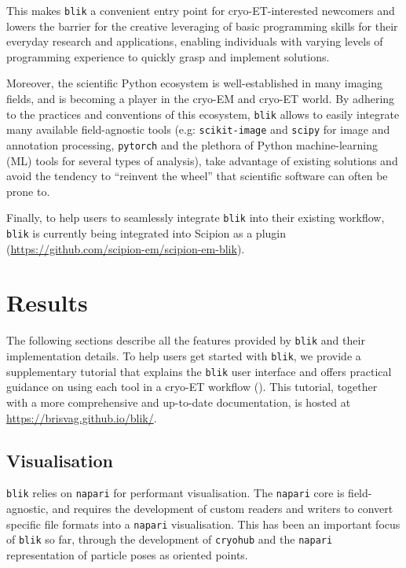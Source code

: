 This makes \texttt{blik} a convenient entry point for cryo-ET-interested newcomers and lowers the barrier for the creative leveraging of basic programming skills for their everyday research and applications, enabling individuals with varying levels of programming experience to quickly grasp and implement solutions.

Moreover, the scientific Python ecosystem is well-established in many imaging fields, and is becoming a player in the cryo-EM and cryo-ET world. By adhering to the practices and conventions of this ecosystem, \texttt{blik} allows to easily integrate many available field-agnostic tools (e.g: \texttt{scikit-image} and \texttt{scipy} for image and annotation processing, \texttt{pytorch} and the plethora of Python machine-learning (ML) tools for several types of analysis), take advantage of existing solutions and avoid the tendency to ``reinvent the wheel'' that scientific software can often be prone to.

\vspace{\baselineskip}

Finally, to help users to seamlessly integrate \texttt{blik} into their existing workflow, \texttt{blik} is currently being integrated into Scipion as a plugin (\url{https://github.com/scipion-em/scipion-em-blik}).

\section{Results}

The following sections describe all the features provided by \texttt{blik} and their implementation details. To help users get started with \texttt{blik}, we provide a supplementary tutorial that explains the \texttt{blik} user interface and offers practical guidance on using each tool in a cryo-ET workflow (). This tutorial, together with a more comprehensive and up-to-date documentation, is hosted at \url{https://brisvag.github.io/blik/}.

\subsection{Visualisation}\label{visualisation}

\texttt{blik} relies on \texttt{napari} for performant visualisation. The \texttt{napari} core is field-agnostic, and requires the development of custom readers and writers to convert specific file formats into a \texttt{napari} visualisation. This has been an important focus of \texttt{blik} so far, through the development of \texttt{cryohub} and the \texttt{napari} representation of particle poses as oriented points.

